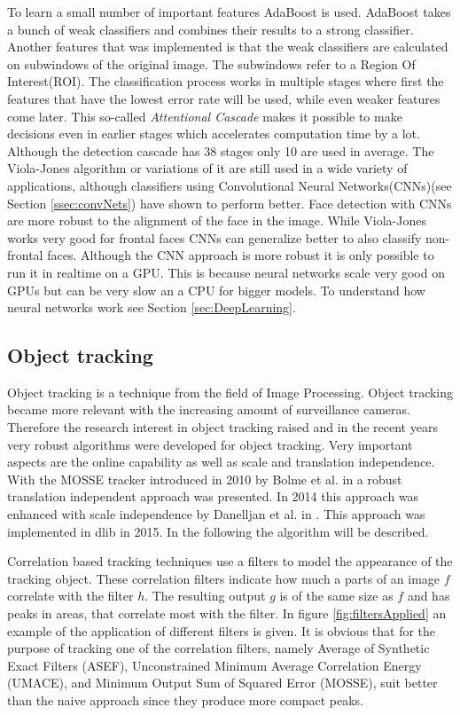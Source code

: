 To learn a small number of important features AdaBoost\cite{FREUND1997119} is used. AdaBoost takes a bunch of weak classifiers and combines their results to a strong classifier.
Another features that was implemented is that the weak classifiers are calculated on subwindows of the original image.
The subwindows refer to a Region Of Interest(ROI).
The classification process works in multiple stages where first the features that have the lowest error rate will be used, while even weaker features come later. 
This so-called \emph{Attentional Cascade} makes it possible to make decisions even in earlier stages which accelerates computation time by a lot.
Although the detection cascade has 38 stages only 10 are used in average.
The Viola-Jones algorithm or variations of it are still used in a wide variety of applications, although classifiers using Convolutional Neural Networks(CNNs)(see Section \ref{ssec:convNets}) have shown to perform better.
Face detection with CNNs are more robust to the alignment of the face in the image. 
While Viola-Jones works very good for frontal faces CNNs can generalize better to also classify non-frontal faces.
Although the CNN approach is more robust it is only possible to run it in realtime on a GPU. This is because neural networks scale very good on GPUs but can be very slow an a CPU for bigger models.
To understand how neural networks work see Section \ref{sec:DeepLearning}.

\subsection{Object tracking}\label{ssec:objectTracking}
Object tracking is a technique from the field of Image Processing. 
Object tracking became more relevant with the increasing amount of surveillance cameras.
Therefore the research interest in object tracking raised and in the recent years very robust algorithms were developed for object tracking. 
Very important aspects are the online capability as well as scale and translation independence. 
With the MOSSE tracker introduced in 2010 by Bolme et al. in \cite{BolmVisu2010} a robust translation independent approach was presented. In 2014 this approach was enhanced with scale independence by Danelljan et al. in \cite{Danelljan2014}. This approach was implemented in dlib \cite{Dlib} in 2015.
In the following the algorithm will be described.

Correlation based tracking techniques use a filters to model the appearance of the tracking object. These correlation filters indicate how much a parts of an image $f$ correlate with the filter $h$.
The resulting output $g$ is of the same size as $f$ and has peaks in areas, that correlate most with the filter.
In figure \ref{fig:filtersApplied} an example of the application of different filters is given. It is obvious that for the purpose of tracking one of the correlation filters, namely Average of
Synthetic Exact Filters (ASEF)\cite{BolmAver2009}, Unconstrained Minimum
Average Correlation Energy (UMACE)\cite{Savvides2003}, and Minimum
Output Sum of Squared Error (MOSSE)\cite{BolmVisu2010}, suit better than the naive approach since they produce more compact peaks.

